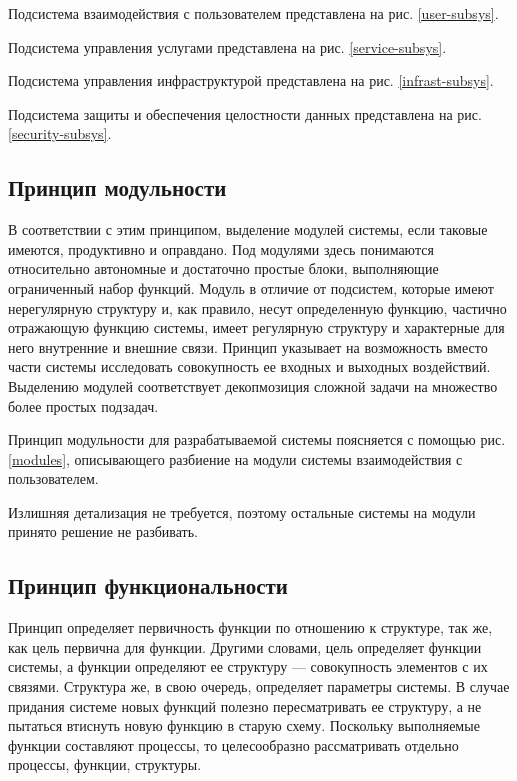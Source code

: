 Подсистема взаимодействия с пользователем представлена на рис. \ref{user-subsys}.

Подсистема управления услугами представлена на рис. \ref{service-subsys}.

Подсистема управления инфраструктурой представлена на рис. \ref{infrast-subsys}.

Подсистема защиты и обеспечения целостности данных представлена на рис. \ref{security-subsys}.

\subsection{Принцип модульности}

В соответствии с этим принципом, выделение модулей системы, если таковые имеются, продуктивно и оправдано.
Под модулями здесь понимаются относительно автономные и достаточно простые блоки, выполняющие ограниченный набор функций.
Модуль в отличие от подсистем, которые имеют нерегулярную структуру и, как правило, несут определенную функцию, частично отражающую функцию системы, имеет регулярную структуру и характерные для него внутренние и внешние связи.
Принцип указывает на возможность вместо части системы исследовать совокупность ее входных и выходных воздействий.
Выделению модулей соответствует декопмозиция сложной задачи на множество более простых подзадач.

Принцип модульности для разрабатываемой системы поясняется с помощью рис. \ref{modules}, описывающего разбиение на модули системы взаимодействия с пользователем.

Излишняя детализация не требуется, поэтому остальные системы на модули принято решение не разбивать.

\subsection{Принцип функциональности}

Принцип определяет первичность функции по отношению к структуре, так же, как цель первична для функции.
Другими словами, цель определяет функции системы, а функции определяют ее структуру --- совокупность элементов с их связями.
Структура же, в свою очередь, определяет параметры системы.
В случае придания системе новых функций полезно пересматривать ее структуру, а не пытаться втиснуть новую функцию в старую схему.
Поскольку выполняемые функции составляют процессы, то целесообразно рассматривать отдельно процессы, функции, структуры.

